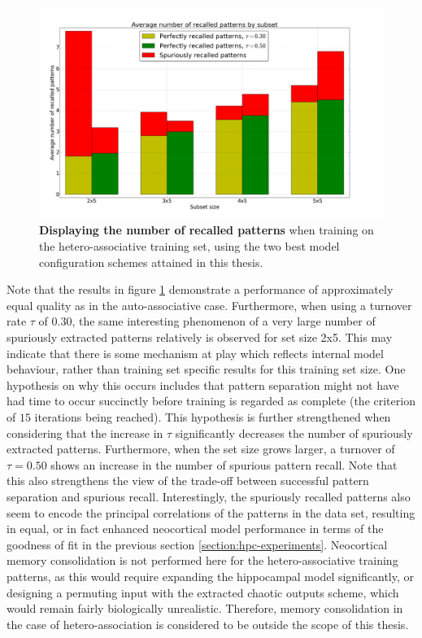 \begin{figure}
    \centering
    \includegraphics[width=15cm]{fig/tr50_tr30}
    \caption{\textbf{Displaying the number of recalled patterns} when training on the hetero-associative training set, using the two best model configuration schemes attained in this thesis.}
    \label{fig:hetero-results}
\end{figure}

Note that the results in figure \ref{fig:hetero-results} demonstrate a performance of approximately equal quality as in the auto-associative case. Furthermore, when using a turnover rate $\tau$ of $0.30$, the same interesting phenomenon of a very large number of spuriously extracted patterns relatively is observed for set size 2x5. This may indicate that there is some mechanism at play which reflects internal model behaviour, rather than training set specific results for this training set size. One hypothesis on why this occurs includes that pattern separation might not have had time to occur succinctly before training is regarded as complete (the criterion of $15$ iterations being reached). This hypothesis is further strengthened when considering that the increase in $\tau$ significantly decreases the number of spuriously extracted patterns. Furthermore, when the set size grows larger, a turnover of $\tau=0.50$ shows an increase in the number of spurious pattern recall. Note that this also strengthens the view of the trade-off between successful pattern separation and spurious recall. Interestingly, the spuriously recalled patterns also seem to encode the principal correlations of the patterns in the data set, resulting in equal, or in fact enhanced neocortical model performance in terms of the goodness of fit in the previous section \ref{section:hpc-experiments}. Neocortical memory consolidation is not performed here for the hetero-associative training patterns, as this would require expanding the hippocampal model significantly, or designing a permuting input with the extracted chaotic outputs scheme, which would remain fairly biologically unrealistic. Therefore, memory consolidation in the case of hetero-association is considered to be outside the scope of this thesis.

